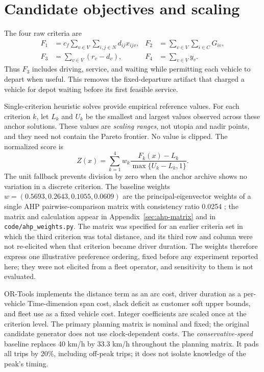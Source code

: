 \documentclass[11pt,a4paper]{article}
\begin{document}
\section{Candidate objectives and scaling}\label{sec:objective-scaling}

The four raw criteria are
\begin{align}
 F_1 &= c_f\sum_{v\in V}\sum_{i,j\in N}d_{ij}x_{ijv},
 &F_2 &= \sum_{v\in V}\sum_{i\in C}G_{iv},\\
 F_3 &= \sum_{v\in V}(r_v-d_v),
 &F_4 &= \sum_{v\in V}y_v.                                 \label{eq:criteria}
\end{align}
Thus $F_3$ includes driving, service, and waiting while permitting each vehicle
to depart when useful. This removes the fixed-departure artifact that charged a
vehicle for depot waiting before its first feasible service.

Single-criterion heuristic solves provide empirical reference values. For each
criterion $k$, let $L_k$ and $U_k$ be the smallest and largest values observed
across these anchor solutions. These values are \emph{scaling ranges}, not
utopia and nadir points, and they need not contain the Pareto frontier. No value
is clipped. The normalized score is
\begin{equation}
 Z(x)=\sum_{k=1}^{4}w_k\frac{F_k(x)-L_k}{\max\{U_k-L_k,1\}}. \label{eq:objective}
\end{equation}
The unit fallback prevents division by zero when the anchor archive shows no
variation in a discrete criterion. The baseline weights
$w=(0.5693,0.2643,0.1055,0.0609)$ are the principal-eigenvector weights of a
single AHP pairwise-comparison matrix with consistency ratio 0.0254
\cite{saaty1980}; the matrix and calculation appear in
Appendix~\ref{sec:ahp-matrix} and in \texttt{code/ahp\_weights.py}. The matrix
was specified for an earlier criteria set in which the third criterion was
total distance, and its third row and column were not re-elicited when that
criterion became driver duration. The weights therefore express one
illustrative preference ordering, fixed before any experiment reported here;
they were not elicited from a fleet operator, and sensitivity to them is not
evaluated.

OR-Tools implements the distance term as an arc cost, driver duration as a
per-vehicle Time-dimension span cost, slack deficit as customer soft upper
bounds, and fleet use as a fixed vehicle cost. Integer coefficients are scaled
once at the criterion level. The primary planning matrix is nominal and fixed;
the original candidate generator does not use clock-dependent costs. The
\emph{conservative-speed} baseline replaces 40 km/h by 33.3 km/h throughout
the planning matrix. It pads all trips by 20\%, including off-peak trips; it
does not isolate knowledge of the peak's timing.
\end{document}
